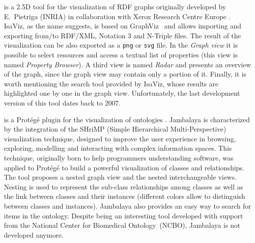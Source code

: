 \begin{description}[wide, labelindent=0pt]
\item[IsaViz] is a 2.5D tool for the visualization of RDF graphs originally developed by E.~Pietriga (INRIA) in collaboration with Xerox Research Centre Europe \cite{pietriga2003isaviz}. IsaViz, as the name suggests, is based on GraphViz~\cite{ellson2001graphviz} and allows importing and exporting from/to RDF/XML, Notation 3 and N-Triple files. The result of the visualization can be also exported as a \texttt{png} or \texttt{svg} file. In the \textit{Graph view} it is possible to select resources and access a textual list of properties (this view is named \textit{Property Browser}). A third view is named \textit{Radar} and presents an overview of the graph, since the graph view may contain only a portion of it. Finally, it is worth mentioning the search tool provided by IsaViz, whose results are highlighted one by one in the graph view. Unfortunately, the last development version of this tool dates back to 2007.

\item[Jambalaya] is a Prot\'eg\'e plugin for the visualization of ontologies \cite{storey2002jambalaya}. Jambalaya is characterized by the integration of the SHriMP (Simple Hierarchical Multi-Per\-spec\-tive) \cite{storey2001shrimp} visualization technique, designed to improve the user experience in browsing, exploring, modelling and interacting with complex information spaces. This technique, originally born to help programmers understanding software, was applied to Prot\'eg\'e to build a powerful visualization of classes and relationships. 
The tool proposes a nested graph view and the nested interchangeable views. Nesting is used to represent the sub-class relationships among classes as well as the link between classes and their instances (different colors allow to distinguish between classes and instances).
Jambalaya also provides an easy way to search for items in the ontology. Despite being an interesting tool developed with support from the National Center for Biomedical Ontology~(NCBO), Jambalaya is not developed anymore.


\end{description}
